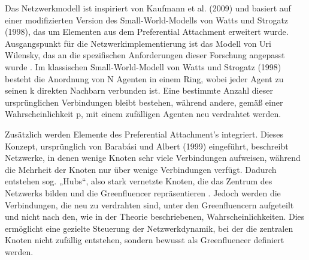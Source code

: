 \documentclass[runningheads]{llncs}
\begin{document}
Das Netzwerkmodell ist inspiriert von Kaufmann et al. (2009) und basiert auf einer modifizierten Version des Small-World-Modells von Watts und Strogatz (1998), das um Elementen aus dem Preferential Attachment erweitert wurde. Ausgangspunkt für die Netzwerkimplementierung ist das Modell von Uri Wilensky, das an die spezifischen Anforderungen dieser Forschung angepasst wurde \cite{wilensky_small_2015}. 
Im klassischen Small-World-Modell von Watts und Strogatz (1998) besteht die Anordnung von N Agenten in einem Ring, wobei jeder Agent zu seinen k direkten Nachbarn verbunden ist. Eine bestimmte Anzahl dieser ursprünglichen Verbindungen bleibt bestehen, während andere, gemäß einer Wahrscheinlichkeit p, mit einem zufälligen Agenten neu verdrahtet werden. %

Zusätzlich werden Elemente des Preferential Attachment's integriert. Dieses Konzept, ursprünglich von Barabási und Albert (1999) eingeführt, beschreibt Netzwerke, in denen wenige Knoten sehr viele Verbindungen aufweisen, während die Mehrheit der Knoten nur über wenige Verbindungen verfügt. Dadurch entstehen sog. „Hubs“, also stark vernetzte Knoten, die das Zentrum des Netzwerks bilden und die Greenfluencer repräsentieren \cite{barabasi_emergence_1999}.
Jedoch werden die Verbindungen, die neu zu verdrahten sind, unter den Greenfluencern aufgeteilt und nicht nach den, wie in der Theorie beschriebenen, Wahrscheinlichkeiten.
Dies ermöglicht eine gezielte Steuerung der Netzwerkdynamik, bei der die zentralen Knoten nicht zufällig entstehen, sondern bewusst als Greenfluencer definiert werden.

\end{document}
